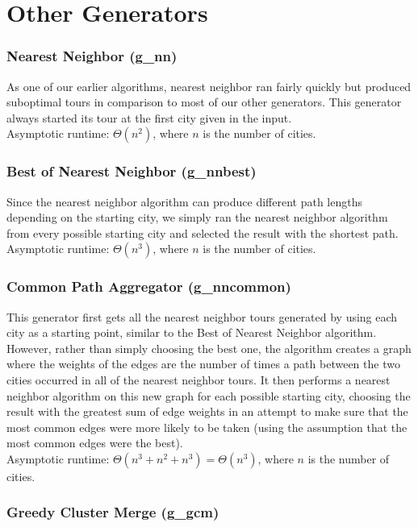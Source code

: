 \documentclass{article}
\begin{document}
\part*{Other Generators}

\section*{Nearest Neighbor (g\_nn)}

As one of our earlier algorithms, nearest neighbor ran fairly quickly but
produced suboptimal tours in comparison to most of our other generators. This
generator always started its tour at the first city given in the
input.\\Asymptotic runtime: $\Theta (n^2)$, where $n$ is the number of cities.

\section*{Best of Nearest Neighbor (g\_nnbest)}

Since the nearest neighbor algorithm can produce different path lengths
depending on the starting city, we simply ran the nearest neighbor algorithm
from every possible starting city and selected the result with the shortest
path.\\Asymptotic runtime: $\Theta (n^3)$, where $n$ is the number of cities.

\section*{Common Path Aggregator (g\_nncommon)}

This generator first gets all the nearest neighbor tours generated by using
each city as a starting point, similar to the Best of Nearest Neighbor
algorithm. However, rather than simply choosing the best one, the algorithm
creates a graph where the weights of the edges are the number of times a path
between the two cities occurred in all of the nearest neighbor tours. It then
performs a nearest neighbor algorithm on this new graph for each possible
starting city, choosing the result with the greatest sum of edge weights in an
attempt to make sure that the most common edges were more likely to be taken
(using the assumption that the most common edges were the best).\\Asymptotic
runtime: $\Theta (n^3 + n^2 + n^3) = \Theta (n^3)$, where $n$ is the number of
cities.

\section*{Greedy Cluster Merge (g\_gcm)}
\end{document}
